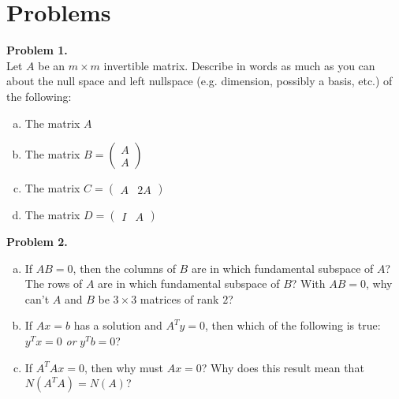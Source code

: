 \documentclass[11pt]{article}
\begin{document}
\newpage
\section{Problems}

\noindent \textbf{Problem 1.}\\
Let $A$ be an $m\times m$ invertible matrix. Describe in words as much as you can about the null space and left nullspace (e.g. dimension, possibly a basis, etc.) of the following:
\begin{enumerate}[(a)]
\item The matrix $A$
\item The matrix $B = \begin{pmatrix} A \\ A \end{pmatrix}$
\item The matrix $C =\begin{pmatrix} A & 2A \end{pmatrix}$
\item The matrix $D = \begin{pmatrix} I & A \end{pmatrix}$
\end{enumerate}

\vskip 150pt

\noindent \textbf{Problem 2.}\\
\begin{enumerate}[(a)]
\item If $AB=0$, then the columns of $B$ are in which fundamental subspace of $A$? The rows of $A$ are in which fundamental subspace of $B$? With $AB=0$, why can't $A$ and $B$ be $3\times 3$ matrices of rank $2$?
\item If $Ax = b$ has a solution and $A^Ty = 0$, then which of the following is true: $y^Tx = 0$ \emph{or} $y^Tb = 0$?
\item If $A^TAx = 0$, then why must $Ax=0$? Why does this result mean that $N(A^TA)=N(A)$?
\end{enumerate}

\newpage
\end{document}
